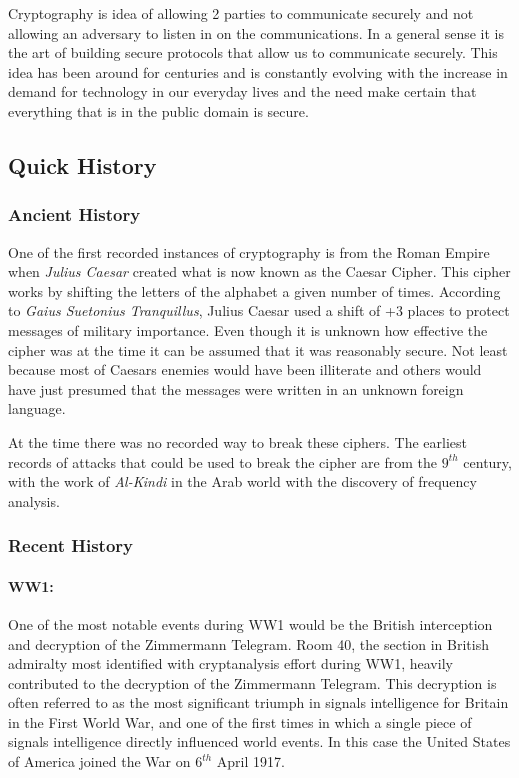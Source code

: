 Cryptography is idea of allowing 2 parties to communicate securely and not allowing an adversary to listen in on the communications. In a general sense it is the art of building secure protocols that allow us to communicate securely. This idea has been around for centuries and is constantly evolving with the increase in demand for technology in our everyday lives and the need make certain that everything that is in the public domain is secure. 

\subsection{Quick History}
\subsubsection{Ancient History}
One of the first recorded instances of cryptography is from the Roman Empire when \textit{Julius Caesar} created what is now known as the Caesar Cipher. This cipher works by shifting the letters of the alphabet a given number of times. According to \textit{Gaius Suetonius Tranquillus}, Julius  Caesar used a shift of +3 places to protect messages of military importance. Even though it is unknown how effective the cipher was at the time it can be assumed that it was reasonably secure. Not least because most of Caesars enemies would have been illiterate and others would have just presumed that the messages were written in an unknown foreign language. 

At the time there was no recorded way to break these ciphers. The earliest records of attacks that could be used to break the cipher are from the $9^{th}$ century, with the work of \textit{Al-Kindi} in the Arab world with the discovery of frequency analysis.
\subsubsection{Recent History}
\paragraph{WW1:}
One of the most notable events during WW1 would be the British interception and decryption of the Zimmermann Telegram. Room 40, the section in British admiralty most identified with cryptanalysis effort during WW1, heavily contributed to the decryption of the Zimmermann Telegram. This decryption is often referred to as the most significant triumph in signals intelligence for Britain in the First World War, and one of the first times in which a single piece of signals intelligence directly influenced world events. In this case the United States of America joined the War on $6^{th}$ April 1917. 

